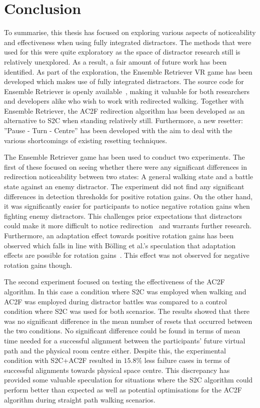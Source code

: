 \chapter{Conclusion}\label{chap:conclusion}
To summarise, this thesis has focused on exploring various aspects of noticeability and effectiveness when using fully integrated distractors. The methods that were used for this were quite exploratory as the space of distractor research still is relatively unexplored. As a result, a fair amount of future work has been identified. As part of the exploration, the Ensemble Retriever VR game has been developed which makes use of fully integrated distractors. The source code for Ensemble Retriever is openly available~\cite{projectRepository}, making it valuable for both researchers and developers alike who wish to work with redirected walking. Together with Ensemble Retriever, the AC2F redirection algorithm has been developed as an alternative to S2C when standing relatively still. Furthermore, a new resetter: ''Pause - Turn - Centre'' has been developed with the aim to deal with the various shortcomings of existing resetting techniques. 

The Ensemble Retriever game has been used to conduct two experiments. The first of these focused on seeing whether there were any significant differences in redirection noticeability between two states: A general walking state and a battle state against an enemy distractor. The experiment did not find any significant differences in detection thresholds for positive rotation gains. On the other hand, it was significantly easier for participants to notice negative rotation gains when fighting enemy distractors. This challenges prior expectations that distractors could make it more difficult to notice redirection~\cite{5072212, schmitz2018you, sra2018vmotion} and warrants further research. Furthermore, an adaptation effect towards positive rotation gains has been observed which falls in line with B{\"o}lling et al.'s speculation that adaptation effects are possible for rotation gains~\cite{bolling2019shrinking}. This effect was not observed for negative rotation gains though. 

The second experiment focused on testing the effectiveness of the AC2F algorithm. In this case a condition where S2C was employed when walking and AC2F was employed during distractor battles was compared to a control condition where S2C was used for both scenarios. The results showed that there was no significant difference in the mean number of resets that occurred between the two conditions. No significant difference could be found in terms of mean time needed for a successful alignment between the participants' future virtual path and the physical room centre either. Despite this, the experimental condition with S2C+AC2F resulted in $15.8\%$ less failure cases in terms of successful alignments towards physical space centre. This discrepancy has provided some valuable speculation for situations where the S2C algorithm could perform better than expected as well as potential optimisations for the AC2F algorithm during straight path walking scenarios. 

